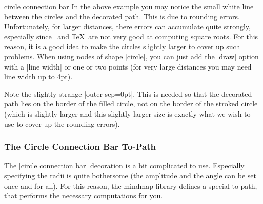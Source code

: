 \begin{decoration}{circle connection bar}
  In the above example you may notice the small white line between the
  circles and the decorated path. This is due to rounding
  errors. Unfortunately, for larger distances, there errors can
  accumulate quite strongly, especially since \tikzname\ and \TeX\ are
  not very good at computing square roots. For this reason, it is a
  good idea to make the circles slightly larger to cover up such
  problems. When using nodes of shape |circle|, you can just add the
  |draw| option with a |line width| or one or two points (for very
  large distances you may need line width up to 4pt). 
\begin{codeexample}[]
\end{codeexample}

  Note the slightly strange |outer sep=0pt|. This is needed so that
  the decorated path lies on the border of the filled circle, not on the
  border of the stroked circle (which is slightly larger and this
  slightly larger size is exactly what we wish to use to cover up the
  rounding errors).
\end{decoration}



\subsubsection{The Circle Connection Bar To-Path}

The |circle connection bar| decoration is a bit complicated to
use. Especially specifying the radii is quite bothersome (the
amplitude and the angle can be set once and for all). For this reason,
the mindmap library defines a special to-path, that performs the
necessary computations for you.

